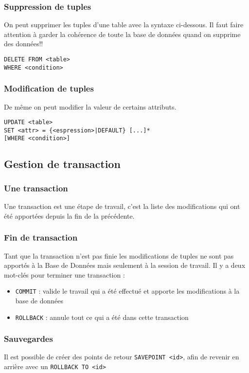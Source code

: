 \documentclass[10pt,a4paper,twoside]{article}
\begin{document}
\subsubsection{Suppression de tuples}
On peut supprimer les tuples d'une table avec la syntaxe ci-dessous. Il faut faire attention à garder la cohérence de toute la base de données quand on supprime des données!!
\begin{verbatim}
DELETE FROM <table>
WHERE <condition>
\end{verbatim}

\subsubsection{Modification de tuples}
De même on peut modifier la valeur de certains attributs.
\begin{verbatim}
UPDATE <table>
SET <attr> = {<espression>|DEFAULT} [...]*
[WHERE <condition>]
\end{verbatim}

\subsection{Gestion de transaction}
\subsubsection{Une transaction} 
Une transaction est une étape de travail, c'est la liste des modifications qui ont été apportées depuis la fin de la précédente.

\subsubsection{Fin de transaction} 
Tant que la transaction n'est pas finie les modifications de tuples ne sont pas apportés à la Base de Données mais seulement à la session de travail. Il y a deux mot-clés pour terminer une transaction :
\begin{itemize}
\item \verb=COMMIT= : valide le travail qui a été effectué et apporte les modifications à la base de données
\item \verb=ROLLBACK= : annule tout ce qui a été dans cette transaction
\end{itemize} 

\subsubsection{Sauvegardes} 
Il est possible de créer des points de retour \verb=SAVEPOINT <id>=, afin de revenir en arrière avec un \verb=ROLLBACK TO <id>=
\end{document}
